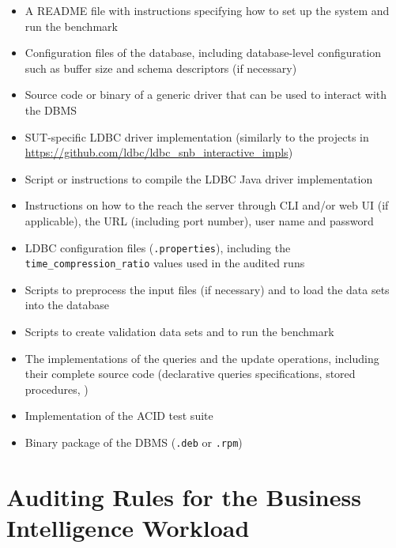 \begin{itemize}
    \item A README file with instructions specifying how to set up the system and run the benchmark
    \item Configuration files of the database, including database-level configuration such as buffer size and schema descriptors (if necessary)
    \item Source code or binary of a generic driver that can be used to interact with the DBMS
    \item SUT-specific LDBC driver implementation (similarly to the projects in \url{https://github.com/ldbc/ldbc_snb_interactive_impls})
    \item Script or instructions to compile the LDBC Java driver implementation
    \item Instructions on how to the reach the server through CLI and/or web UI (if applicable), \eg the URL (including port number), user name and password
    \item LDBC configuration files (\texttt{.properties}), including the \texttt{time\_compression\_ratio} values used in the audited runs
    \item Scripts to preprocess the input files (if necessary) and to load the data sets into the database
    \item Scripts to create validation data sets and to run the benchmark
    \item The implementations of the queries and the update operations, including their complete source code (\eg declarative queries specifications, stored procedures, \etc)
    \item Implementation of the ACID test suite
    \item Binary package of the DBMS (\eg \texttt{.deb} or \texttt{.rpm})
\end{itemize}




\section{Auditing Rules for the Business Intelligence Workload}
\label{sec:bi-workload-audit}


